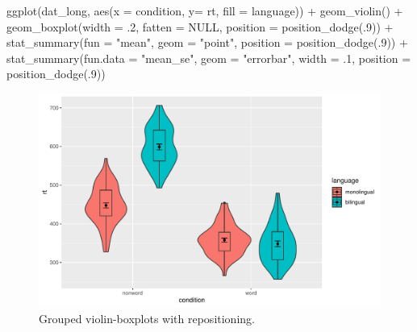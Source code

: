 \documentclass[
  english,
  doc,floatsintext]{apa6}
\newenvironment{Shaded}{\begin{snugshade}}{\end{snugshade}}
\newcommand{\AttributeTok}[1]{\textcolor[rgb]{0.77,0.63,0.00}{#1}}
\newcommand{\ConstantTok}[1]{\textcolor[rgb]{0.00,0.00,0.00}{#1}}
\newcommand{\DecValTok}[1]{\textcolor[rgb]{0.00,0.00,0.81}{#1}}
\newcommand{\FunctionTok}[1]{\textcolor[rgb]{0.00,0.00,0.00}{#1}}
\newcommand{\NormalTok}[1]{#1}
\newcommand{\SpecialCharTok}[1]{\textcolor[rgb]{0.00,0.00,0.00}{#1}}
\newcommand{\StringTok}[1]{\textcolor[rgb]{0.31,0.60,0.02}{#1}}
\begin{document}
\begin{Shaded}
\begin{Highlighting}[]
\FunctionTok{ggplot}\NormalTok{(dat\_long, }\FunctionTok{aes}\NormalTok{(}\AttributeTok{x =}\NormalTok{ condition, }\AttributeTok{y=}\NormalTok{ rt, }\AttributeTok{fill =}\NormalTok{ language)) }\SpecialCharTok{+}
  \FunctionTok{geom\_violin}\NormalTok{() }\SpecialCharTok{+}
  \FunctionTok{geom\_boxplot}\NormalTok{(}\AttributeTok{width =}\NormalTok{ .}\DecValTok{2}\NormalTok{, }\AttributeTok{fatten =} \ConstantTok{NULL}\NormalTok{, }\AttributeTok{position =} \FunctionTok{position\_dodge}\NormalTok{(.}\DecValTok{9}\NormalTok{)) }\SpecialCharTok{+}
  \FunctionTok{stat\_summary}\NormalTok{(}\AttributeTok{fun =} \StringTok{"mean"}\NormalTok{, }\AttributeTok{geom =} \StringTok{"point"}\NormalTok{, }
               \AttributeTok{position =} \FunctionTok{position\_dodge}\NormalTok{(.}\DecValTok{9}\NormalTok{)) }\SpecialCharTok{+}
  \FunctionTok{stat\_summary}\NormalTok{(}\AttributeTok{fun.data =} \StringTok{"mean\_se"}\NormalTok{, }\AttributeTok{geom =} \StringTok{"errorbar"}\NormalTok{, }\AttributeTok{width =}\NormalTok{ .}\DecValTok{1}\NormalTok{,}
               \AttributeTok{position =} \FunctionTok{position\_dodge}\NormalTok{(.}\DecValTok{9}\NormalTok{))}
\end{Highlighting}
\end{Shaded}

\begin{figure}

{\centering \includegraphics[width=1\linewidth]{images/viobox3-1} 

}

\caption{Grouped violin-boxplots with repositioning.}\label{fig:viobox3}
\end{figure}
\end{document}
